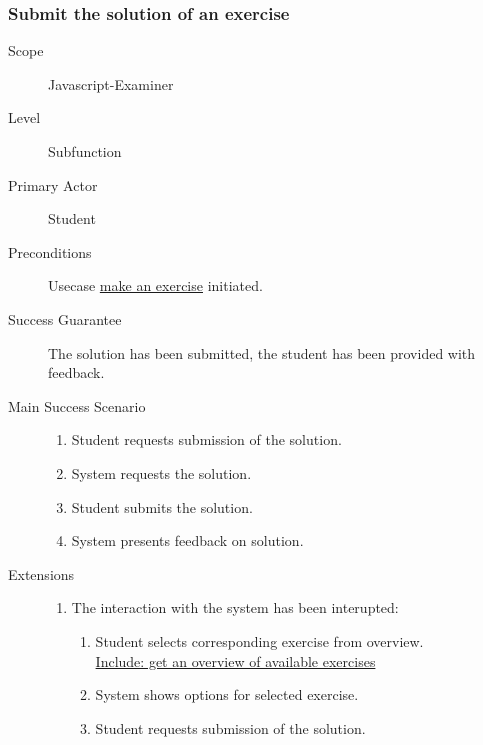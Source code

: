 \documentclass{article}
\begin{document}
\subsubsection{Submit the solution of an exercise}
\begin{mdframed} [rightmargin=-100pt]
\begin{description}
  \item[Scope] Javascript-Examiner
  \item[Level] Subfunction
  \item[Primary Actor] Student
  \item[Preconditions] Usecase \underline{make an exercise} initiated.
  \item[Success Guarantee] The solution has been submitted, the student has been
    provided with feedback.
  \item[Main Success Scenario] \mbox{}
    \begin{enumerate}
		\item Student requests submission of the solution.
		\item System requests the solution.
		\item Student submits the solution.
		\item System presents feedback on solution.
    \end{enumerate} 
  \item[Extensions] \mbox{}
	\begin{enumerate}
      \renewcommand{\labelenumi}{\theenumi a.}
	  \item The interaction with the system has been interupted:
		\begin{enumerate}[(1)]
		  \renewcommand{\labelenumii}{\theenumii .}
		  \item Student selects corresponding exercise from overview. \\
		    \underline{Include: get an overview of available exercises}
		  \item System shows options for selected exercise.
		  \item Student requests submission of the solution.
		\end{enumerate}
	\end{enumerate}
\end{description}
\end{mdframed}
\end{document}
